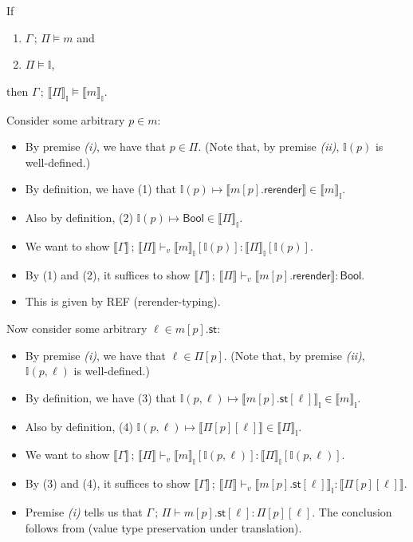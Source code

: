 \documentclass{article}
\newcommand{\mf}[1]{\mathsf{#1}}
\newcommand{\semi}{\,;\,}
\newcommand{\hl}[1]{\colorbox{LightGoldenrod1}{#1}}
\newcommand{\llrr}[1]{\llbracket #1 \rrbracket}
\newcommand{\tbool}{\mf{Bool}}
\newcommand{\I}{\mathbb{I}}
\begin{document}
\begin{lemma}
If \begin{enumerate}[label=(\roman*)]
\item $\Gamma \semi \Pi \vDash m$ and
\item $\Pi \vDash \I$,
\end{enumerate}
then $\Gamma \semi \llrr{\Pi}_\I \vDash \llrr{m}_\I$.

\begin{Proof}
Consider some arbitrary $p \in m$:
\begin{itemize}
\item By premise \emph{(i)}, we have that $p \in \Pi$.
(Note that, by premise \emph{(ii)}, $\I(p)$ is well-defined.)
\item By definition, we have (1) that 
$\I(p) \mapsto \llrr{m[p].\mf{rerender}} \in \llrr{m}_\I$.
\item Also by definition, (2)
$\I(p) \mapsto \tbool \in \llrr{\Pi}_\I$.
\item We want to show $\llrr{\Gamma} \semi \llrr{\Pi} \vdash_v
\llrr{m}_\I[\I(p)] : \llrr{\Pi}_\I[\I(p)]$.
\item By (1) and (2),
it suffices to show $\llrr{\Gamma} \semi \llrr{\Pi} \vdash_v
\llrr{m[p].\mf{rerender}} : \tbool$.
\item This is given by \hl{REF} (rerender-typing).
\end{itemize}

Now consider some arbitrary $\ell \in m[p].\mf{st}$:
\begin{itemize}
\item By premise \emph{(i)}, we have that $\ell \in \Pi[p]$.
(Note that, by premise \emph{(ii)}, $\I(p, \ell)$ is well-defined.)
\item By definition, we have (3) that 
$\I(p, \ell) \mapsto \llrr{m[p].\mf{st}[\ell]}_\I \in \llrr{m}_\I$.
\item Also by definition, (4)
$\I(p, \ell) \mapsto \llrr{\Pi[p][\ell]} \in \llrr{\Pi}_\I$.
\item We want to show $\llrr{\Gamma} \semi \llrr{\Pi} \vdash_v
\llrr{m}_\I[\I(p, \ell)] : \llrr{\Pi}_\I[\I(p, \ell)]$.
\item By (3) and (4),
it suffices to show $\llrr{\Gamma} \semi \llrr{\Pi} \vdash_v
\llrr{m[p].\mf{st}[\ell]}_\I : \llrr{\Pi[p][\ell]}$.
\item Premise \emph{(i)} tells us that
$\Gamma \semi \Pi \vdash m[p].\mf{st}[\ell]: \Pi[p][\ell]$.
The conclusion follows from 
(value type preservation under translation).
\end{itemize}

\end{Proof}
\end{lemma}
\end{document}
